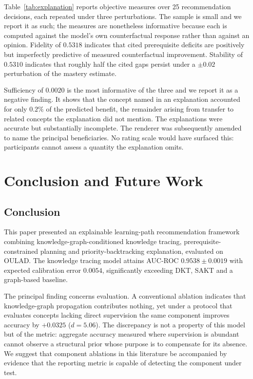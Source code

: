 \documentclass[conference]{IEEEtran}
\begin{document}
Table~\ref{tab:explanation} reports objective measures over 25 recommendation decisions,
each repeated under three perturbations. The sample is small and we report it as such;
the measures are nonetheless informative because each is computed against the model's own
counterfactual response rather than against an opinion. Fidelity of $0.5318$ indicates
that cited prerequisite deficits are positively but imperfectly predictive of measured
counterfactual improvement. Stability of $0.5310$ indicates that roughly half the cited
gaps persist under a $\pm 0.02$ perturbation of the mastery estimate.

Sufficiency of $0.0020$ is the most informative of the three and we report it as a
negative finding. It shows that the concept named in an explanation accounted for only
$0.2\%$ of the predicted benefit, the remainder arising from transfer to related concepts
the explanation did not mention. The explanations were accurate but substantially
incomplete. The renderer was subsequently amended to name the principal beneficiaries.
No rating scale would have surfaced this: participants cannot assess a quantity the
explanation omits.

\section{Conclusion and Future Work}
\label{sec:conclusion}

\subsection{Conclusion}

This paper presented an explainable learning-path recommendation framework combining
knowledge-graph-conditioned knowledge tracing, prerequisite-constrained planning and
priority-backtracking explanation, evaluated on OULAD. The knowledge tracing model
attains AUC-ROC $0.9538 \pm 0.0019$ with expected calibration error $0.0054$,
significantly exceeding DKT, SAKT and a graph-based baseline.

The principal finding concerns evaluation. A conventional ablation indicates that
knowledge-graph propagation contributes nothing, yet under a protocol that evaluates
concepts lacking direct supervision the same component improves accuracy by $+0.0325$
($d = 5.06$). The discrepancy is not a property of this model but of the metric: aggregate
accuracy measured where supervision is abundant cannot observe a structural prior whose
purpose is to compensate for its absence. We suggest that component ablations in this
literature be accompanied by evidence that the reporting metric is capable of detecting
the component under test.
\end{document}
